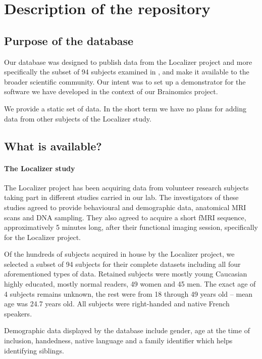 \documentclass[review]{elsarticle}
\begin{document}
\section{Description of the repository}

\subsection{Purpose of the database}

Our database was designed to publish data from the Localizer project
\cite{Pinel2007} and more specifically the subset of 94 subjects examined
in \cite{Pinel2012}, and make it available to the broader
scientific community. Our intent was to set up a demonstrator for the
software we have developed in the context of our Brainomics project.

We provide a static set of data. In the short term we have no plans for
adding data from other subjects of the Localizer study.


\subsection{What is available?}

\paragraph{The Localizer study} The Localizer project has been acquiring data
from volunteer research subjects taking part in different studies carried
in our lab. The investigators of these studies agreed to provide behavioural
and demographic data, anatomical MRI scans and DNA sampling. They also agreed to
acquire a short fMRI sequence, approximatively 5 minutes long, after their functional
imaging session, specifically for the Localizer project.

Of the hundreds of subjects acquired in house by the Localizer project, we selected a subset of 94 subjects for their complete datasets \cite{Pinel2012} including all four aforementioned types of data. Retained subjects were mostly young Caucasian highly educated, mostly normal readers, 49 women and 45 men. The exact age of 4 subjects remains unknown, the rest were from 18 through 49 years old -- mean age was 24.7 years old. All subjects were right-handed and native French speakers.

Demographic data displayed by the database include gender, age at the time of inclusion, handedness, native language and a family identifier which helps identifying siblings.
\end{document}
